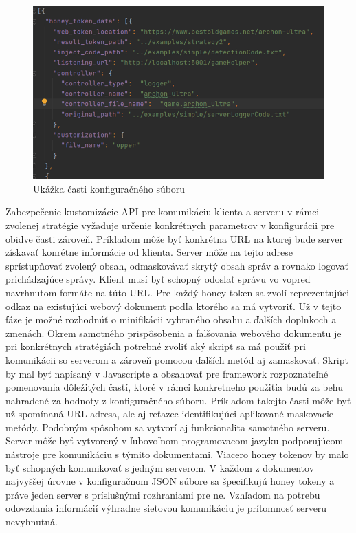 \documentclass[conference, 11pt,slovak,a4paper,twoside]{IEEEtran}
\begin{document}
\begin{figure}[!t]  %
					\begin{center}
									\includegraphics[width=\linewidth]{fig/configurationFile.png}
									\caption{Ukážka časti konfiguračného súboru}
									\label{configurationFile}
					\end{center}
\end{figure}


Zabezpečenie kustomizácie API pre komunikáciu klienta a serveru v rámci zvolenej stratégie vyžaduje určenie konkrétnych parametrov v konfigurácii pre obidve časti zároveň. Príkladom môže byť konkrétna URL na ktorej bude server získavať konrétne informácie od klienta. Server môže na tejto adrese sprístupňovať zvolený obsah, odmaskovávať skrytý obsah správ a rovnako logovať prichádzajúce správy. Klient musí byť schopný odoslať správu vo vopred navrhnutom formáte na túto URL. Pre každý honey token sa zvolí reprezentujúci odkaz na existujúci webový dokument podľa ktorého sa má vytvoriť. Už v tejto fáze je možné rozhodnúť o minifikácii vybraného obsahu a ďalších doplnkoch a zmenách. Okrem samotného prispôsobenia a falšovania webového dokumentu je pri konkrétnych stratégiách potrebné zvoliť aký skript sa má použiť pri komunikácii so serverom a zároveň pomocou ďalších metód aj zamaskovať. Skript by mal byť napísaný v Javascripte a obsahovať pre framework rozpoznateľné pomenovania dôležitých častí, ktoré v rámci konkretneho použitia budú za behu nahradené za hodnoty z konfiguračného súboru. Príkladom takejto časti môže byť už spomínaná URL adresa, ale aj reťazec identifikujúci aplikované maskovacie metódy. Podobným spôsobom sa vytvorí aj funkcionalita samotného serveru. Server môže byť vytvorený v ľubovoľnom programovacom jazyku podporujúcom nástroje pre komunikáciu s týmito dokumentami. Viacero honey tokenov by malo byť schopných komunikovať s jedným serverom. V každom z dokumentov najvyššej úrovne v konfiguračnom JSON súbore sa špecifikujú honey tokeny a práve jeden server s príslušnými rozhraniami pre ne. Vzhľadom na potrebu odovzdania informácií výhradne sieťovou komunikáciu je prítomnosť serveru nevyhnutná. 
\end{document}
